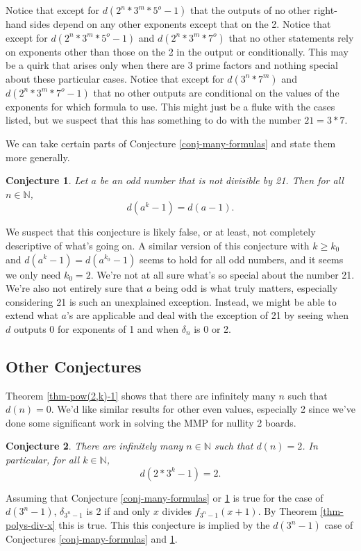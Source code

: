\documentclass[a4paper]{article}
\newtheorem{conjecture}{Conjecture}
\newcommand{\N}{\mathbb{N}}
\begin{document}
	Notice that except for $d(2^n * 3^m * 5^o - 1)$ that the outputs of no other right-hand sides depend on any other exponents except that on the 2.
	Notice that except for $d(2^n * 3^m * 5^o - 1)$ and $d(2^n * 3^m * 7^o)$ that no other statements rely on exponents other than those on the 2 in the output or conditionally.
	This may be a quirk that arises only when there are 3 prime factors and nothing special about these particular cases.
	Notice that except for $d(3^n * 7^m)$ and $d(2^n * 3^m * 7^o - 1)$ that no other outputs are conditional on the values of the exponents for which formula to use.
	This might just be a fluke with the cases listed, but we suspect that this has something to do with the number $21 = 3 * 7$.

	We can take certain parts of Conjecture \ref{conj-many-formulas} and state them more generally.
	\begin{conjecture}\label{conj-odds}
		Let $a$ be an odd number that is not divisible by 21.
		Then for all $n \in \N$,
		\begin{equation*}
			d(a^k - 1) = d(a-1).
		\end{equation*}
	\end{conjecture}
	We suspect that this conjecture is likely false, or at least, not completely descriptive of what's going on.
	A similar version of this conjecture with $k \geq k_0$ and $d(a^k - 1) = d(a^{k_0} - 1)$ seems to hold for all odd numbers, and it seems we only need $k_0 = 2$.
	We're not at all sure what's so special about the number 21.
	We're also not entirely sure that $a$ being odd is what truly matters, especially considering 21 is such an unexplained exception.
	Instead, we might be able to extend what $a$'s are applicable and deal with the exception of 21 by seeing when $d$ outputs 0 for exponents of 1 and when $\delta_{n}$ is 0 or 2.
	
	\subsection{Other Conjectures}
	Theorem \ref{thm-pow(2,k)-1} shows that there are infinitely many $n$ such that $d(n) = 0$.
	We'd like similar results for other even values, especially 2 since we've done some significant work in solving the MMP for nullity 2 boards.
	\begin{conjecture}\label{conj-inf-nullity-2}
		There are infinitely many $n \in \N$ such that $d(n) = 2$.
		In particular, for all $k \in \N$,
		\begin{equation*}
			d(2 * 3^k - 1) = 2.
		\end{equation*}
	\end{conjecture}
	Assuming that Conjecture \ref{conj-many-formulas} or \ref{conj-odds} is true for the case of $d(3^n - 1)$, $\delta_{3^n - 1}$ is 2 if and only $x$ divides $f_{3^n - 1}(x+1)$.
	By Theorem \ref{thm-polys-div-x} this is true.
	This this conjecture is implied by the $d(3^n - 1)$ case of Conjectures \ref{conj-many-formulas} and \ref{conj-odds}.
	
\end{document}
